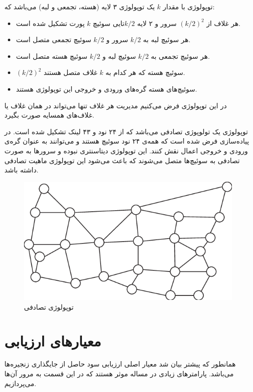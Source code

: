 توپولوژی  با مقدار \(k\) یک توپولوژی ۳ لایه (هسته، تجمعی و لبه) می‌باشد که:
\begin{itemize}
    \item هر غلاف از \((k/2)^2\) سرور و ۲ لایه \(k/2\)تایی سوئیچ \(k\) پورت تشکیل شده است.
    \item هر سوئیچ لبه به \(k/2\) سرور و \(k/2\) سوئیچ تجمعی متصل است.
    \item هر سوئیچ تجمعی به \(k/2\) سوئیچ لبه و \(k/2\) سوئیچ هسته متصل است.
    \item \((k/2)^2\) سوئیچ هسته که هر کدام به \(k\) غلاف متصل هستند.
    \item سوئیچ‌های هسته گره‌های ورودی و خروجی این توپولوژی هستند.
\end{itemize}
در این توپولوژی فرض می‌کنیم مدیریت هر غلاف تنها می‌تواند در همان غلاف یا غلاف‌های همسایه صورت بگیرد.

توپولوژی  یک تولوپوژی تصادفی می‌باشد که از ۲۴ نود و ۴۳ لینک تشکیل شده است.
در پیاده‌سازی فرض شده است که همه‌ی ۲۴ نود سوئیچ هستند و می‌توانند به عنوان گره‌ی ورودی و خروجی اعمال نقش کنند.
این توپولوژی دیتاسنتری نبوده و سرور‌ها به صورت تصادفی به سوئیچ‌ها متصل می‌شوند که باعث می‌شود
این توپولوژی ماهیت تصادفی داشته باشد.

\begin{figure}[!h]
\center\includegraphics[scale=.5]{images/usnet}
\caption{توپولوژی تصادفی }
\label{fig.3}
\end{figure}

\section{معیار‌های ارزیابی}

همانطور که پیشتر بیان شد معیار اصلی ارزیابی سود حاصل از جایگذاری زنجیره‌ها می‌باشد.
پارامترهای زیادی در مساله موثر هستند که در این قسمت به مرور آن‌ها می‌پردازیم.

